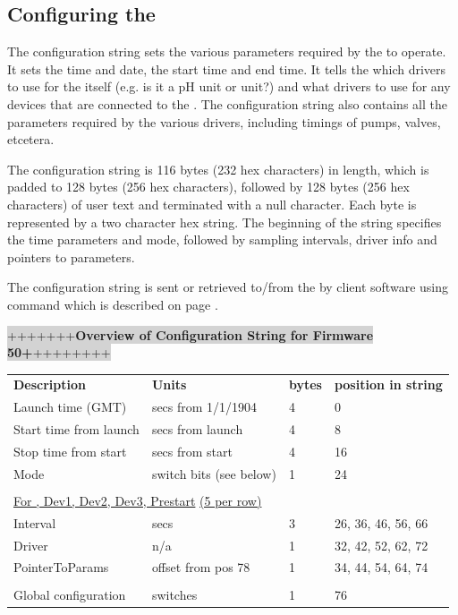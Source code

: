 \subsection*{Configuring the \instType{}}

The configuration string sets the various parameters required by the
\instType{} to operate. It sets the time and date, the start time and end time.
It tells the \instType{} which drivers to use for the \instType{} itself (e.g. is it a
pH unit or \dioxide{} unit?) and what drivers to use for any devices that are
connected to the \instType{}. The configuration string also contains all the
parameters required by the various drivers, including timings of pumps,
valves, etcetera.

The configuration string is 116 bytes (232 hex characters) in length,
which is padded to 128 bytes (256 hex characters), followed by 128 bytes
(256 hex characters) of user text and terminated with a null
character. Each byte is represented by a two character hex string. The
beginning of the string specifies the time parameters and mode, followed
by sampling intervals, driver info and pointers to parameters.

The configuration string is sent or retrieved to/from the \instType{} by client
software using  command which is described on page \pageref{sec:Lcommand}.\\
\begin{center}
\colorbox{lightgray}{+++++++\textbf{Overview of Configuration String for Firmware 50+}++++++++}\\
\end{center}


\begin{tabular}{ m{10em} m{12em} m{2em} <{\centering} m{8em} <{\centering} } 

\textbf{Description} & \textbf{Units} & \textbf{bytes} & \textbf{position in string} \\
Launch time (GMT) 		& secs from 1/1/1904 	& 4 	& 0 \\
Start time from launch 	& secs from launch 		& 4 	& 8 \\
Stop time from start 		& secs from start 		& 4 	& 16 \\
Mode 				& switch bits (see below) 	& 1 	& 24 \\
 & & & \\
 \multicolumn{4}{l}{\underline{For \instType{}, Dev1, Dev2, Dev3, Prestart} \underline{(5 per row)}}\\
Interval 			& secs 			& 3 	& 26, 36, 46, 56, 66\\
Driver 			& n/a 			& 1 	& 32, 42, 52, 62, 72\\
PointerToParams 	& offset from pos 78	& 1 	& 34, 44, 54, 64, 74\\
 & & & \\
Global configuration & switches 		& 1 	& 76\\
\end{tabular}

